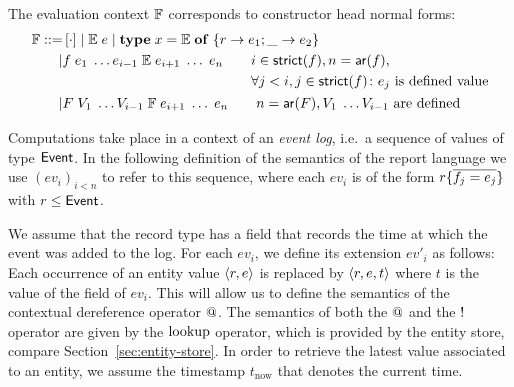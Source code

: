 The evaluation context ${\mathbb F}$ corresponds to constructor head normal
forms:
\begin{align*}
  \fcxt \ebnf &\cxthole \bnfsep \ecxt \; e \bnfsep \typeof{x =
    \ecxt}{\{r \to e_1\semi \default \to e_2\}}%
  \\%
  \bnfsep &f\; e_1 \; \dots e_{i-1} \; \ecxt \; e_{i+1} \; \dots \;
  e_n\qquad
  \begin{aligned}[t]
    &i\in \strict{f}, n = \arity{f},\\
    &\forall j < i, j\in \strict{f}\colon e_j \text{ is defined value}
  \end{aligned}
  \\%
  \bnfsep &F\; V_1 \; \dots V_{i-1} \; \fcxt \; e_{i+1} \; \dots \;
  e_n\qquad n= \arity{F}, V_1 \; \dots V_{i-1} \text{ are defined}
\end{align*}

Computations take place in a context of an \emph{event log}, i.e.\ a
sequence of values of type $\mathsf{Event}$. In the following
definition of the semantics of the report language we use
$(ev_i)_{i<n}$ to refer to this sequence, where each $ev_i$ is of the
form $r \{\overline{f_j = e_j}\}$ with $r \le \mathsf{Event}$.

We assume that the  record type has a field
 that records the time at which the event
was added to the log. For each $ev_i$, we define its extension $ev'_i$
as follows: Each occurrence of an entity value $\left\langle r,e\right\rangle$ is
replaced by $\left\langle r,e,t\right\rangle$ where $t$ is the value of the
 field of $ev_i$. This will allow us to
define the semantics of the contextual dereference operator
$@$. The semantics of both the $@$ and the $!$
operator are given by the $\operatorname{lookup}$ operator, which is provided by
the entity store, compare Section~\ref{sec:entity-store}. In order to
retrieve the latest value associated to an entity, we assume the
timestamp $t_\mathrm{now}$ that denotes the current time.

